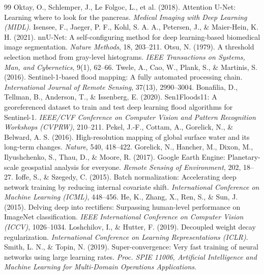 \documentclass[10pt]{article}
\begin{document}
{\begin{thebibliography}{99}
 Oktay, O., Schlemper, J., Le Folgoc, L., et al. (2018). Attention U-Net: Learning where to look for the pancreas. \emph{Medical Imaging with Deep Learning (MIDL)}.
 Isensee, F., Jaeger, P. F., Kohl, S. A. A., Petersen, J., \& Maier-Hein, K. H. (2021). nnU-Net: A self-configuring method for deep learning-based biomedical image segmentation. \emph{Nature Methods}, 18, 203--211.
 Otsu, N. (1979). A threshold selection method from gray-level histograms. \emph{IEEE Transactions on Systems, Man, and Cybernetics}, 9(1), 62--66.
 Twele, A., Cao, W., Plank, S., \& Martinis, S. (2016). Sentinel-1-based flood mapping: A fully automated processing chain. \emph{International Journal of Remote Sensing}, 37(13), 2990--3004.
 Bonafilia, D., Tellman, B., Anderson, T., \& Issenberg, E. (2020). Sen1Floods11: A georeferenced dataset to train and test deep learning flood algorithms for Sentinel-1. \emph{IEEE/CVF Conference on Computer Vision and Pattern Recognition Workshops (CVPRW)}, 210--211.
 Pekel, J.-F., Cottam, A., Gorelick, N., \& Belward, A. S. (2016). High-resolution mapping of global surface water and its long-term changes. \emph{Nature}, 540, 418--422.
 Gorelick, N., Hancher, M., Dixon, M., Ilyushchenko, S., Thau, D., \& Moore, R. (2017). Google Earth Engine: Planetary-scale geospatial analysis for everyone. \emph{Remote Sensing of Environment}, 202, 18--27.
 Ioffe, S., \& Szegedy, C. (2015). Batch normalization: Accelerating deep network training by reducing internal covariate shift. \emph{International Conference on Machine Learning (ICML)}, 448--456.
 He, K., Zhang, X., Ren, S., \& Sun, J. (2015). Delving deep into rectifiers: Surpassing human-level performance on ImageNet classification. \emph{IEEE International Conference on Computer Vision (ICCV)}, 1026--1034.
 Loshchilov, I., \& Hutter, F. (2019). Decoupled weight decay regularization. \emph{International Conference on Learning Representations (ICLR)}.
 Smith, L. N., \& Topin, N. (2019). Super-convergence: Very fast training of neural networks using large learning rates. \emph{Proc. SPIE 11006, Artificial Intelligence and Machine Learning for Multi-Domain Operations Applications}.
\end{thebibliography}
}
\end{document}
